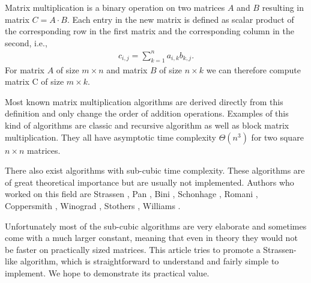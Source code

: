 \documentclass[a4paper,11pt]{article}
\begin{document}

Matrix multiplication is a binary operation on two matrices 
$A$ and $B$ resulting in matrix $C=A \cdot B$. Each entry in the new matrix is defined as scalar product of the corresponding row in the first matrix and the corresponding column in the second, i.e.,
\begin{align*}
c_{i,j} = \sum_{k=1}^{n} a_{i,k} b_{k,j}.
\end{align*}
For matrix $A$ of size $m \times n$ and matrix $B$ of size $n \times k$ we can therefore compute matrix C of size $m \times k$. %


Most known matrix multiplication algorithms are derived directly from this definition and only change the order of addition operations. 
Examples of this kind of algorithms are classic and recursive algorithm as well as block matrix multiplication.
They all have asymptotic time complexity $\Theta(n^3)$ for two square $n \times n$ matrices.

There also exist algorithms with sub-cubic time complexity. These algorithms are of great theoretical importance but are usually not implemented.
Authors who worked on this field are Strassen \cite{Strassen1969}, Pan \cite{Pan1978a}, Bini \cite{Bini1979}, Schonhage \cite{Schoenhage1971}, Romani \cite{Romani1982}, Coppersmith \cite{Coppersmith1982}, Winograd \cite{Coppersmith1982}, Stothers \cite{Davie2013}, Williams \cite{Williams}.

Unfortunately most of the sub-cubic algorithms are very elaborate 
and sometimes come with a much larger constant, meaning that even in theory they would not be faster on practically sized matrices.
This article tries to promote a Strassen-like algorithm, which is
straightforward to understand and fairly simple to implement. 
We hope to demonstrate its practical value.

\end{document}

